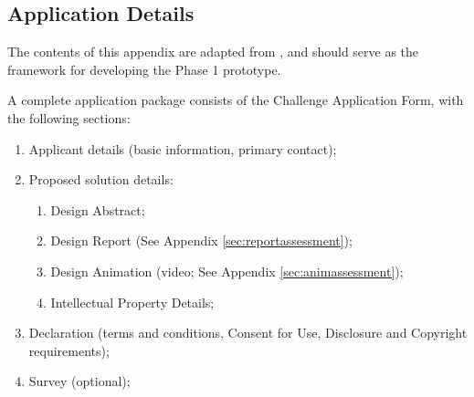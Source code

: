 \documentclass{report}
\begin{document}
\begin{appendices}
\newpage

\section{Application Details}
\label{sec:application}

The contents of this appendix are adapted from \cite{applicantguide}, and should serve as the framework 
for developing the Phase 1 prototype.

A complete application package consists of the Challenge Application Form, with the following sections:

\begin{enumerate}
    \item Applicant details (basic information, primary contact);
    \item Proposed solution details:
    \begin{enumerate}
        \item Design Abstract;
        \item Design Report (See Appendix \ref{sec:reportassessment});
        \item Design Animation (video; See Appendix \ref{sec:animassessment});
        \item Intellectual Property Details;
    \end{enumerate}
    \item Declaration (terms and conditions, Consent for Use, Disclosure and Copyright requirements);
    \item Survey (optional);
\end{enumerate}

\end{appendices}

\newpage




\end{document}
